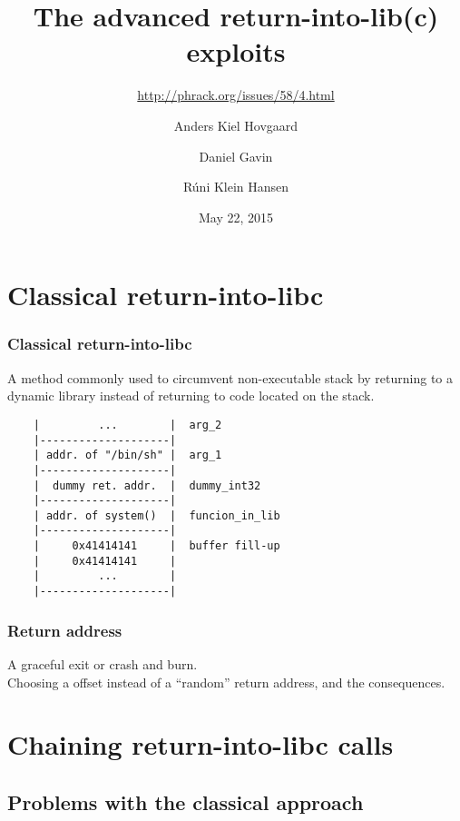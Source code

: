 \documentclass[10pt]{beamer}
\title{The advanced return-into-lib(c) exploits}
\subtitle{\url{http://phrack.org/issues/58/4.html}}
\author{Anders Kiel Hovgaard \and Daniel Gavin \and Rúni Klein Hansen}
\institute{Department of Computer Science, University of Copenhagen}
\date{May 22, 2015}
\begin{document}
\frame{\titlepage}

\section{Classical return-into-libc}  %

\begin{frame}[fragile]
  \frametitle{Classical return-into-libc}

  A method commonly used to circumvent non-executable stack by returning to a
  dynamic library instead of returning to code located on the stack.

  \begin{verbatim}
    |         ...        |  arg_2
    |--------------------|
    | addr. of "/bin/sh" |  arg_1
    |--------------------|
    |  dummy ret. addr.  |  dummy_int32
    |--------------------|
    | addr. of system()  |  funcion_in_lib
    |--------------------|
    |     0x41414141     |  buffer fill-up
    |     0x41414141     |
    |         ...        |
    |--------------------|
  \end{verbatim}
\end{frame}

\begin{frame}
\frametitle{Return address}
A graceful exit or crash and burn.\\
\vspace{5mm}
Choosing a offset instead of a ``random'' return address, and the consequences.
\end{frame}

\section{Chaining return-into-libc calls} %

\subsection{Problems with the classical approach}
\end{document}
